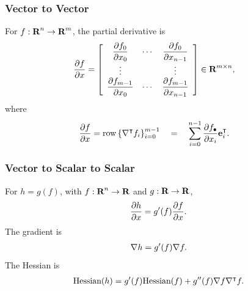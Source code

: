 \documentclass{article}
\begin{document}
    \subsubsection{Vector to Vector}
        For $f:\textbf{R}^n\to\textbf{R}^m$, the partial derivative is
        \begin{align*}
            \frac{\partial f}{\partial x}&=\left[\begin{array}{ccc}
            \dfrac{\partial f_0}{\partial x_0} & \cdots & \dfrac{\partial f_0}{\partial x_{n-1}}\\
            \vdots & & \vdots\\
            \dfrac{\partial f_{m-1}}{\partial x_0} & \cdots & \dfrac{\partial f_{m-1}}{\partial x_{n-1}}
            \end{array}\right]\in\textbf{R}^{m\times n},
        \end{align*}
        where
        \begin{align*}
            \frac{\partial f}{\partial x}&=\text{row}\left\{\nabla^\intercal f_i\right\}_{i=0}^{m-1}\quad=\quad \sum_{i=0}^{n-1}\dfrac{\partial f_\bullet}{\partial x_i}\textbf{e}_i^\intercal.
        \end{align*}
    
        \subsubsection{Vector to Scalar to Scalar}
        For $h=g(f)$, with $f:\textbf{R}^n\to\textbf{R}$ and $g:\textbf{R}\to\textbf{R}$,
        \begin{align*}
            \frac{\partial h}{\partial x}=g'(f)\frac{\partial f}{\partial x}.
        \end{align*}
        The gradient is 
        \begin{align*}
            \nabla h = g'(f) \nabla f.
        \end{align*}
        The Hessian is 
        \begin{align*}
            \text{Hessian}(h) = g'(f)\text{Hessian}(f)+g''(f)\nabla f\nabla^\intercal f.
        \end{align*}
    
\end{document}
